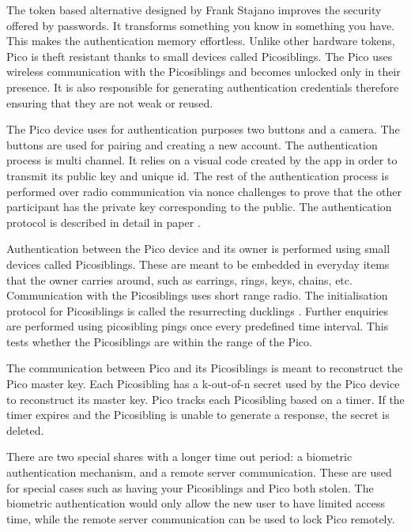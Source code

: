 The token based alternative designed by Frank Stajano improves the security offered by passwords. It transforms something you know in something you have. This makes the authentication memory effortless. Unlike other hardware tokens, Pico is theft resistant thanks to small devices called Picosiblings. The Pico uses wireless communication with the Picosiblings and becomes unlocked only in their presence. It is also responsible for generating authentication credentials therefore ensuring that they are not weak or reused.

The Pico device uses for authentication purposes two buttons and a camera. The buttons are used for pairing and creating a new account. The authentication process is multi channel. It relies on a visual code created by the app in order to transmit its public key and unique id. The rest of the authentication process is performed over radio communication via nonce challenges to prove that the other participant has the private key corresponding to the public. The authentication protocol is described in detail in paper \cite{stajano2011pico}.

Authentication between the Pico device and its owner is performed using small devices called Picosiblings. These are meant to be embedded in everyday items that the owner carries around, such as earrings, rings, keys, chains, etc. Communication with the Picosiblings uses short range radio. The initialisation protocol for Picosiblings is called the resurrecting ducklings \cite{stajano2000resurrecting}. Further enquiries are performed using picosibling pings once every predefined time interval. This tests whether the Picosiblings are within the range of the Pico.

The communication between Pico and its Picosiblings is meant to reconstruct the Pico master key. Each Picosibling has a k-out-of-n secret used by the Pico device to reconstruct its master key. Pico tracks each Picosibling based on a timer. If the timer expires and the Picosibling is unable to generate a response, the secret is deleted. 

There are two special shares with a longer time out period: a biometric authentication mechanism, and a remote server communication. These are used for special cases such as having your Picosiblings and Pico both stolen. The biometric authentication would only allow the new user to have limited access time, while the remote server communication can be used to lock Pico remotely.









